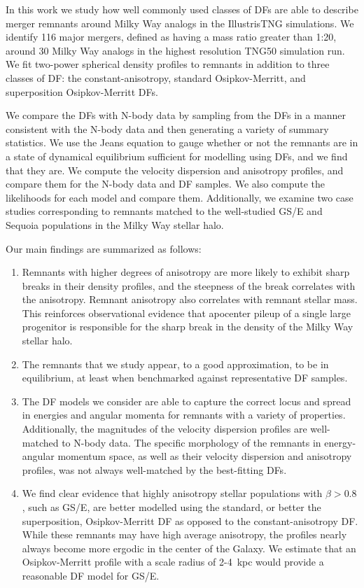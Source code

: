 In this work we study how well commonly used classes of DFs are able to describe merger remnants around Milky Way analogs in the IllustrisTNG simulations. We identify 116 major mergers, defined as having a mass ratio greater than 1:20, around 30 Milky Way analogs in the highest resolution TNG50 simulation run. We fit two-power spherical density profiles to remnants in addition to three classes of DF: the constant-anisotropy, standard Osipkov-Merritt, and superposition Osipkov-Merritt DFs.

We compare the DFs with N-body data by sampling from the DFs in a manner consistent with the N-body data and then generating a variety of summary statistics. We use the Jeans equation to gauge whether or not the remnants are in a state of dynamical equilibrium sufficient for modelling using DFs, and we find that they are. We compute the velocity dispersion and anisotropy profiles, and compare them for the N-body data and DF samples. We also compute the likelihoods for each model and compare them. Additionally, we examine two case studies corresponding to remnants matched to the well-studied GS/E and Sequoia populations in the Milky Way stellar halo.

Our main findings are summarized as follows:

\begin{enumerate}
    \item Remnants with higher degrees of anisotropy are more likely to exhibit sharp breaks in their density profiles, and the steepness of the break correlates with the anisotropy. Remnant anisotropy also correlates with remnant stellar mass. This reinforces observational evidence that apocenter pileup of a single large progenitor is responsible for the sharp break in the density of the Milky Way stellar halo.
    \item The remnants that we study appear, to a good approximation, to be in equilibrium, at least when benchmarked against representative DF samples.
    \item The DF models we consider are able to capture the correct locus and spread in energies and angular momenta for remnants with a variety of properties. Additionally, the magnitudes of the velocity dispersion profiles are well-matched to N-body data. The specific morphology of the remnants in energy-angular momentum space, as well as their velocity dispersion and anisotropy profiles, was not always well-matched by the best-fitting DFs.
    \item We find clear evidence that highly anisotropy stellar populations with $\beta > 0.8$, such as GS/E, are better modelled using the standard, or better the superposition, Osipkov-Merritt DF as opposed to the constant-anisotropy DF. While these remnants may have high average anisotropy, the profiles nearly always become more ergodic in the center of the Galaxy. We estimate that an Osipkov-Merritt profile with a scale radius of 2-4~kpc would provide a reasonable DF model for GS/E.
\end{enumerate}

